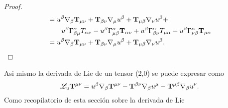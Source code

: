 \begin{proof}
\begin{equation}
\begin{aligned}
                                       & =  u^\beta \mathbf{\nabla}_\beta {\ensuremath{\mathbf{T}}}_{\mu \nu}+{\mathbf{T}}_{\beta \nu}\mathbf{\nabla}_\mu u^\beta +{\mathbf{T}}_{\mu \beta } \mathbf{\nabla}_\nu u^\beta +                                                                                                                                                                                                                  \\
        &\qquad u^\beta \Gamma_{\beta \mu}^\alpha T_{\alpha \nu}-u^\beta \Gamma^\alpha_{\mu \beta}{\mathbf{T}}_{\alpha \nu} + u^\beta \Gamma_{\beta \nu}^\alpha T_{\mu \alpha}- u^\beta \Gamma^\alpha_{\nu \beta}{\mathbf{T}}_{\mu \alpha }                                                                                                                                                                     \\
                                       & = u^\beta \mathbf{\nabla}_\beta {\ensuremath{\mathbf{T}}}_{\mu \nu}+{\mathbf{T}}_{\beta \nu}\mathbf{\nabla}_\mu u^\beta +{\mathbf{T}}_{\mu \beta } \mathbf{\nabla}_\nu u^\beta.
     \end{aligned}
 \end{equation}
\end{proof}
\noindent Asi mismo la derivada de Lie de un tensor (2,0) se puede expresar como
\begin{equation}
    \mathscr{L}_u {\mathbf{T}}^{\mu \nu} = u^\beta \mathbf{\nabla}_\beta {\ensuremath{\mathbf{T}}}^{\mu \nu}-{\mathbf{T}}^{\beta \nu}\mathbf{\nabla}_\beta u^\mu - {\mathbf{T}}^{\mu \beta } \mathbf{\nabla}_\beta u^\nu.
\end{equation}
Como recopilatorio de esta sección sobre la derivada de Lie
